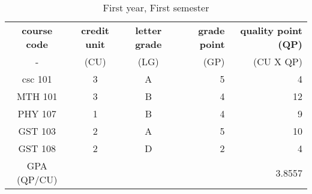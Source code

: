 \documentclass{article}
\begin{document}
	\begin{table}[h!]
		\begin{center}
			\caption{First year, First semester}
			\label{tab:table1}
		\begin{tabular}{|c|c|c|r|r|}
			\hline
			\textbf{course code} & \textbf{credit unit} & \textbf{letter grade} & \textbf{grade point} & \textbf{quality point (QP)}\\
		
			- & (CU) & (LG) & (GP) & (CU X QP)\\
		 \hline
			csc 101 & 3 & A & 5 & 4 \\
			MTH 101 & 3 & B & 4 & 12\\
			PHY 107 & 1 & B & 4 & 9\\
			GST 103 & 2 & A & 5 & 10\\
			GST 108 & 2 & D & 2 & 4\\
		    GPA (QP/CU) &   &   &   &3.8557   \\
			\hline
			\end{tabular}
		\end{center}
	\end{table}
\end{document}
